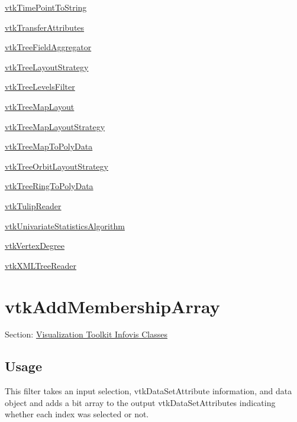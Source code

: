\begin{DoxyItemize}
\item \hyperlink{vtkinfovis_vtktimepointtostring}{vtk\-Time\-Point\-To\-String}  
\item \hyperlink{vtkinfovis_vtktransferattributes}{vtk\-Transfer\-Attributes}  
\item \hyperlink{vtkinfovis_vtktreefieldaggregator}{vtk\-Tree\-Field\-Aggregator}  
\item \hyperlink{vtkinfovis_vtktreelayoutstrategy}{vtk\-Tree\-Layout\-Strategy}  
\item \hyperlink{vtkinfovis_vtktreelevelsfilter}{vtk\-Tree\-Levels\-Filter}  
\item \hyperlink{vtkinfovis_vtktreemaplayout}{vtk\-Tree\-Map\-Layout}  
\item \hyperlink{vtkinfovis_vtktreemaplayoutstrategy}{vtk\-Tree\-Map\-Layout\-Strategy}  
\item \hyperlink{vtkinfovis_vtktreemaptopolydata}{vtk\-Tree\-Map\-To\-Poly\-Data}  
\item \hyperlink{vtkinfovis_vtktreeorbitlayoutstrategy}{vtk\-Tree\-Orbit\-Layout\-Strategy}  
\item \hyperlink{vtkinfovis_vtktreeringtopolydata}{vtk\-Tree\-Ring\-To\-Poly\-Data}  
\item \hyperlink{vtkinfovis_vtktulipreader}{vtk\-Tulip\-Reader}  
\item \hyperlink{vtkinfovis_vtkunivariatestatisticsalgorithm}{vtk\-Univariate\-Statistics\-Algorithm}  
\item \hyperlink{vtkinfovis_vtkvertexdegree}{vtk\-Vertex\-Degree}  
\item \hyperlink{vtkinfovis_vtkxmltreereader}{vtk\-X\-M\-L\-Tree\-Reader}  
\end{DoxyItemize}\hypertarget{vtkinfovis_vtkaddmembershiparray}{}\section{vtk\-Add\-Membership\-Array}\label{vtkinfovis_vtkaddmembershiparray}
Section\-: \hyperlink{sec_vtkinfovis}{Visualization Toolkit Infovis Classes} \hypertarget{vtkwidgets_vtkxyplotwidget_Usage}{}\subsection{Usage}\label{vtkwidgets_vtkxyplotwidget_Usage}
This filter takes an input selection, vtk\-Data\-Set\-Attribute information, and data object and adds a bit array to the output vtk\-Data\-Set\-Attributes indicating whether each index was selected or not.

